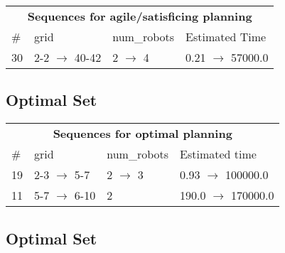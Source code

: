 \documentclass{article}
\begin{document}
                        \begin{center}
                        \begin{tabular}{@{}l|l|l|l@{}}
                        \multicolumn{4}{c}{\bf \large Sequences for agile/satisficing planning}\\
                        \# & grid & num\_robots & Estimated Time\\\midrule
                        30&2-2 $\rightarrow$ 40-42&2 $\rightarrow$ 4&0.21 $\rightarrow$ 57000.0
                        \end{tabular}
                        \end{center}
                    
                            \subsection*{Optimal Set}

                            \begin{center}
                            \begin{tabular}{@{}l|l|l|l@{}}
                            \multicolumn{4}{c}{\bf \large Sequences for optimal planning}\\
                            \# & grid & num\_robots & Estimated time\\\midrule
                            19&2-3 $\rightarrow$ 5-7&2 $\rightarrow$ 3&0.93 $\rightarrow$ 100000.0\\
11&5-7 $\rightarrow$ 6-10&2&190.0 $\rightarrow$ 170000.0
                            \end{tabular}
                            \end{center}
                    
                                \subsection*{Optimal Set}
                                
\end{document}
